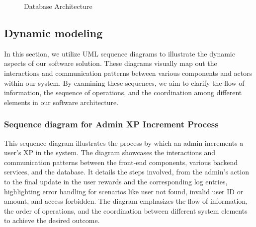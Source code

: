 \begin{figure}[H]
    \centering
    \caption{Database Architecture}
    \label{fig:database-architecture}
\end{figure}

\subsection{Dynamic modeling}
In this section, we utilize UML sequence diagrams to illustrate the dynamic aspects of our software solution. These diagrams visually map out the interactions and communication patterns between various components and actors within our system. By examining these sequences, we aim to clarify the flow of information, the sequence of operations, and the coordination among different elements in our software architecture.
\subsubsection{Sequence diagram for Admin XP Increment Process}

This sequence diagram illustrates the process by which an admin increments a user's XP in the system. The diagram showcases the interactions and communication patterns between the front-end components, various backend services, and the database. It details the steps involved, from the admin's action to the final update in the user rewards and the corresponding log entries, highlighting error handling for scenarios like user not found, invalid user ID or amount, and access forbidden. The diagram emphasizes the flow of information, the order of operations, and the coordination between different system elements to achieve the desired outcome.

